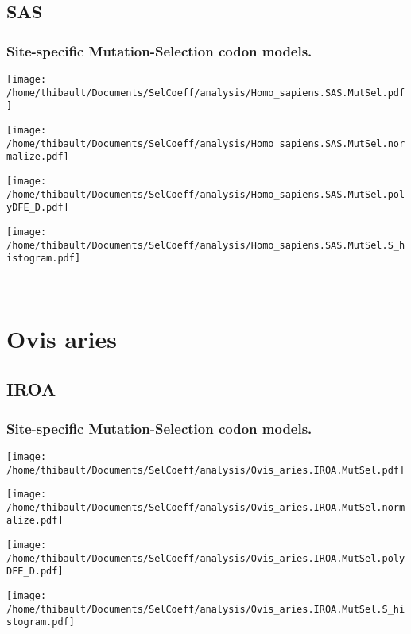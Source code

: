 \subsection{SAS} 
 
\subsubsection*{Site-specific Mutation-Selection codon models.} 
\begin{minipage}{0.49\linewidth} 
\texttt{[image: /home/thibault/Documents/SelCoeff/analysis/Homo\_sapiens.SAS.MutSel.pdf]} 
\end{minipage}
\begin{minipage}{0.49\linewidth} 
\texttt{[image: /home/thibault/Documents/SelCoeff/analysis/Homo\_sapiens.SAS.MutSel.normalize.pdf]} 
\end{minipage}
\begin{minipage}{0.49\linewidth} 
\texttt{[image: /home/thibault/Documents/SelCoeff/analysis/Homo\_sapiens.SAS.MutSel.polyDFE\_D.pdf]} 
\end{minipage}
\begin{minipage}{0.49\linewidth} 
\texttt{[image: /home/thibault/Documents/SelCoeff/analysis/Homo\_sapiens.SAS.MutSel.S\_histogram.pdf]} 
\end{minipage}
\\ 
\section{Ovis aries} 
 
\subsection{IROA} 
 
\subsubsection*{Site-specific Mutation-Selection codon models.} 
\begin{minipage}{0.49\linewidth} 
\texttt{[image: /home/thibault/Documents/SelCoeff/analysis/Ovis\_aries.IROA.MutSel.pdf]} 
\end{minipage}
\begin{minipage}{0.49\linewidth} 
\texttt{[image: /home/thibault/Documents/SelCoeff/analysis/Ovis\_aries.IROA.MutSel.normalize.pdf]} 
\end{minipage}
\begin{minipage}{0.49\linewidth} 
\texttt{[image: /home/thibault/Documents/SelCoeff/analysis/Ovis\_aries.IROA.MutSel.polyDFE\_D.pdf]} 
\end{minipage}
\begin{minipage}{0.49\linewidth} 
\texttt{[image: /home/thibault/Documents/SelCoeff/analysis/Ovis\_aries.IROA.MutSel.S\_histogram.pdf]} 
\end{minipage}
\\ 
